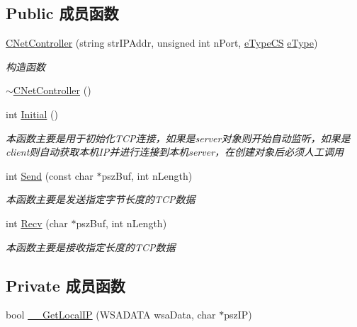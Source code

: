 \subsection*{Public 成员函数}
\begin{DoxyCompactItemize}
\item 
\hyperlink{class_c_net_controller_a3648c7b399e2e252b8bd04d23a3c3c03}{C\+Net\+Controller} (string str\+I\+P\+Addr, unsigned int n\+Port, \hyperlink{_c_net_controller_8h_aa5667d9d3fb7d8d8f6293e70f99fd81d}{e\+Type\+CS} \hyperlink{_c_net_controller_8h_a12f8ec8f0e7a4584b9fe481bb53fa60e}{e\+Type})
\begin{DoxyCompactList}\small\item\em 构造函数 \end{DoxyCompactList}\item 
\hyperlink{class_c_net_controller_a27201190f2a9821379921627ab66a52d}{$\sim$\+C\+Net\+Controller} ()
\item 
int \hyperlink{class_c_net_controller_afeccfc8409078f390fe6e7b8c7e9b4b6}{Initial} ()
\begin{DoxyCompactList}\small\item\em 本函数主要是用于初始化\+T\+C\+P连接，如果是server对象则开始自动监听，如果是client则自动获取本机\+I\+P并进行连接到本机server，在创建对象后必须人工调用 \end{DoxyCompactList}\item 
int \hyperlink{class_c_net_controller_ac413c9924a1093308dbfdac68ce4bbc4}{Send} (const char $\ast$psz\+Buf, int n\+Length)
\begin{DoxyCompactList}\small\item\em 本函数主要是发送指定字节长度的\+T\+C\+P数据 \end{DoxyCompactList}\item 
int \hyperlink{class_c_net_controller_a9d08826c3ea2a87cf17990318fab9dd3}{Recv} (char $\ast$psz\+Buf, int n\+Length)
\begin{DoxyCompactList}\small\item\em 本函数主要是接收指定长度的\+T\+C\+P数据 \end{DoxyCompactList}\end{DoxyCompactItemize}
\subsection*{Private 成员函数}
\begin{DoxyCompactItemize}
\item 
bool \hyperlink{class_c_net_controller_aa231c51362064abdd6bce973f73dca8e}{\+\_\+\+\_\+\+Get\+Local\+IP} (W\+S\+A\+D\+A\+TA wsa\+Data, char $\ast$psz\+IP)
\end{DoxyCompactItemize}
